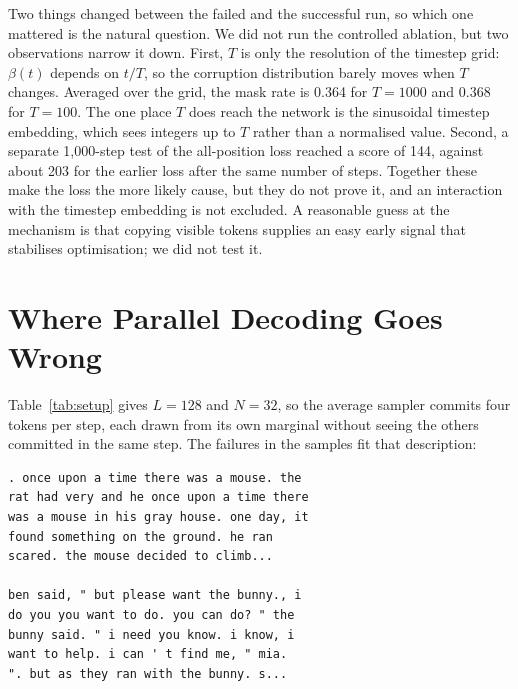 \documentclass[conference]{IEEEtran}
\begin{document}
Two things changed between the failed and the successful run, so which one
mattered is the natural question. We did not run the controlled ablation, but
two observations narrow it down. First, $T$ is only the resolution of the
timestep grid: $\beta(t)$ depends on $t/T$, so the corruption distribution
barely moves when $T$ changes. Averaged over the grid, the mask rate is 0.364
for $T{=}1000$ and 0.368 for $T{=}100$. The one place $T$ does reach the network
is the sinusoidal timestep embedding, which sees integers up to $T$ rather than
a normalised value. Second, a separate 1{,}000-step test of the all-position
loss reached a score of 144, against about 203 for the earlier loss after the
same number of steps. Together these make the loss the more likely cause, but
they do not prove it, and an interaction with the timestep embedding is not
excluded. A reasonable guess at the mechanism is that copying visible tokens
supplies an easy early signal that stabilises optimisation; we did not test it.

\section{Where Parallel Decoding Goes Wrong}
\label{sec:sampling}

Table~\ref{tab:setup} gives $L{=}128$ and $N{=}32$, so the average sampler commits
four tokens per step, each drawn from its own marginal without seeing the others
committed in the same step. The failures in the samples fit that description:

\begin{lstlisting}
. once upon a time there was a mouse. the
rat had very and he once upon a time there
was a mouse in his gray house. one day, it
found something on the ground. he ran
scared. the mouse decided to climb...

ben said, " but please want the bunny., i
do you you want to do. you can do? " the
bunny said. " i need you know. i know, i
want to help. i can ' t find me, " mia.
". but as they ran with the bunny. s...
\end{lstlisting}
\end{document}
